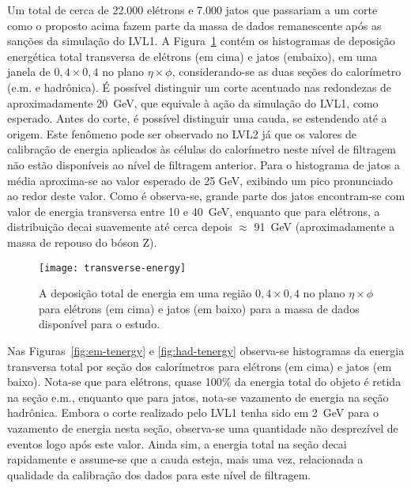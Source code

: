 Um total de cerca de 22.000 elétrons e 7.000 jatos que passariam a um corte
como o proposto acima fazem parte da massa de dados remanescente após as
sanções da simulação do LVL1. A Figura~\ref{fig:transverse-energy} contém os
histogramas de deposição energética total transversa de elétrons (em cima) e
jatos (embaixo), em uma janela de $0,4 \times 0,4$ no plano $\eta\times\phi$,
considerando-se as duas seções do calorímetro (e.m. e hadrônica). É possível
distinguir um corte acentuado nas redondezas de aproximadamente 20~GeV, que
equivale à ação da simulação do LVL1, como esperado. Antes do corte, é
possível distinguir uma cauda, se estendendo até a origem. Este fenômeno pode
ser observado no LVL2 já que os valores de calibração de energia aplicados às
células do calorímetro neste nível de filtragem não estão disponíveis ao nível
de filtragem anterior. Para o histograma de jatos a média aproxima-se ao valor
esperado de 25 GeV, exibindo um pico pronunciado ao redor deste valor. Como é
observa-se, grande parte dos jatos encontram-se com valor de energia
transversa entre 10 e 40~GeV, enquanto que para elétrons, a distribuição decai
suavemente até cerca depois $\approx$ 91~GeV (aproximadamente a massa de
repouso do bóson Z).


\begin{figure}
\begin{center}
\texttt{[image: transverse-energy]}
\end{center}
\caption{A deposição total de energia em uma região $0,4 \times 0,4$ no plano
$\eta\times\phi$ para elétrons (em cima) e jatos (em baixo) para a massa de
dados disponível para o estudo.}
\label{fig:transverse-energy}
\end{figure}

Nas Figuras~\ref{fig:em-tenergy} e \ref{fig:had-tenergy} observa-se
histogramas da energia transversa total por seção dos calorímetros para
e\-lé\-trons (em cima) e jatos (em baixo). Nota-se que para elétrons, quase
100\% da energia total do objeto é retida na seção e.m., enquanto que para
jatos, nota-se vazamento de energia na seção hadrônica. Embora o corte
realizado pelo LVL1 tenha sido em 2~GeV para o vazamento de energia nesta
seção, observa-se uma quantidade não desprezível de eventos logo após este
valor. Ainda sim, a energia total na seção decai rapidamente e assume-se que a
cauda esteja, mais uma vez, relacionada a qualidade da calibração dos dados
para este nível de filtragem.

